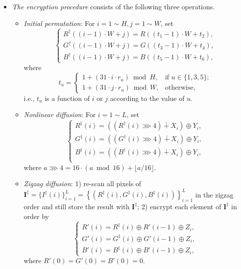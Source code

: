\documentclass{ws-ijbc}
\begin{document}
\begin{itemize}
\item\textit{The encryption procedure} consists of
the following three operations.
\begin{itemize}
\item
\textit{Initial permutation}: For $i=1\sim H, j=1\sim W$, set
\begin{equation}
\label{eq:permutation}
\begin{cases}
R^{\dagger}((i-1)\cdot W+ j) = R((t_1-1)\cdot W+ t_2), \\
G^{\dagger}((i-1)\cdot W+ j) = G((t_3-1)\cdot W+ t_4), \\
B^{\dagger}((i-1)\cdot W+ j) = B((t_5-1)\cdot W+ t_6),
\end{cases}
\end{equation}
where
\begin{equation}
\nonumber
t_u =
\begin{cases}
1 + (31 \cdot i\cdot r_u)\bmod{H}, &\mbox{if } u\in\{1, 3, 5\}; \\
1 + (31 \cdot j\cdot r_u)\bmod{W}, &\mbox{otherwise},
\end{cases}
\end{equation}
i.e., $t_u$ is a function of $i$ or $j$ according to the value of $u$.

\item
\textit{Nonlinear diffusion}: For $i = 1 \sim L$, set
\begin{equation}
\label{eq:nonlinear}
\begin{cases}
R^{\ddagger}(i) = \left(\left(R^{\dagger}(i)\ggg 4\right) \dotplus X_{i}\right)\oplus Y_{i}, \\
G^{\ddagger}(i) = \left(\left(G^{\dagger}(i)\ggg 4\right) \dotplus X_{i}\right)\oplus Y_{i}, \\
B^{\ddagger}(i) = \left(\left(B^{\dagger}(i)\ggg 4\right) \dotplus X_{i}\right)\oplus Y_{i}, \\
\end{cases}
\end{equation}
where $a\ggg 4 = 16\cdot(a\bmod{16})+\lfloor a/16 \rfloor$.

\item \textit{Zigzag diffusion}: 1) re-scan all pixels of $\mathbf{I}^{\ddagger}=\{I^{\ddagger}(i)\}_{i=1}^{L}=\left\{(R^{\ddagger}(i), G^{\ddagger}(i), B^{\ddagger}(i))\right\}_{i=1}^{L}$ in the zigzag order and still store the result with $\mathbf{I}^{\ddagger}$;
    2) encrypt each element of $\mathbf{I}^{\ddagger}$ in order by
\begin{equation}
\label{eq:zigzag}
\begin{cases}
R'(i) = R^{\ddagger}(i) \oplus R'(i-1) \oplus Z_{i}, \\
G'(i) = G^{\ddagger}(i) \oplus G'(i-1) \oplus Z_{i}, \\
B'(i) = B^{\ddagger}(i) \oplus B'(i-1) \oplus Z_{i},
\end{cases}
\end{equation}
where $R'(0) = G'(0) = B'(0) = 0$.
\end{itemize}


\end{itemize}
\end{document}
